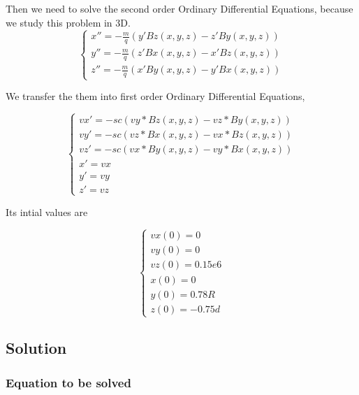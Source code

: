 \documentclass[12pt]{article}
\begin{document}
Then we need to solve the second order Ordinary Diﬀerential Equations, because we study this problem in 3D.
\begin{equation}
    \begin{cases}
        x''=-\frac{m}{q}(y'Bz(x,y,z)-z'By(x,y,z))\\
        y''=-\frac{m}{q}(z'Bx(x,y,z)-x'Bz(x,y,z))\\
        z''=-\frac{m}{q}(x'By(x,y,z)-y'Bx(x,y,z))
    \end{cases}
\end{equation}

We transfer the them into first order Ordinary Diﬀerential Equations,

\begin{equation}
    \begin{cases}
        vx'=-sc(vy*Bz(x,y,z)-vz*By(x,y,z))\\
        vy'=-sc(vz*Bx(x,y,z)-vx*Bz(x,y,z))\\
        vz'=-sc(vx*By(x,y,z)-vy*Bx(x,y,z))\\
        x'=vx\\
        y'=vy\\
        z'=vz
    \end{cases}
\end{equation}

Its intial values are

\begin{equation}
    \begin{cases}
        vx(0)=0\\
        vy(0)=0\\
        vz(0)=0.15e6\\
        x(0)=0\\
        y(0)=0.78R\\
        z(0)=-0.75d
    \end{cases}
\end{equation}
\subsection{Solution}
\subsubsection{Equation to be solved}

\indent


\end{document}
